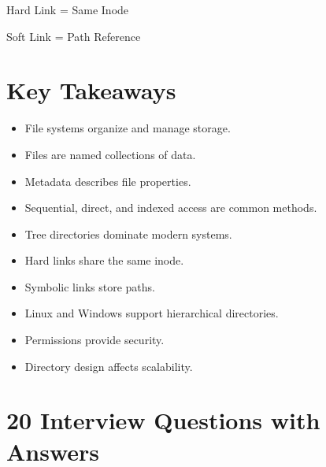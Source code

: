 \begin{center}
Hard Link = Same Inode

Soft Link = Path Reference
\end{center}

\section{Key Takeaways}

\begin{itemize}
\item File systems organize and manage storage.
\item Files are named collections of data.
\item Metadata describes file properties.
\item Sequential, direct, and indexed access are common methods.
\item Tree directories dominate modern systems.
\item Hard links share the same inode.
\item Symbolic links store paths.
\item Linux and Windows support hierarchical directories.
\item Permissions provide security.
\item Directory design affects scalability.
\end{itemize}

\section{20 Interview Questions with Answers}

